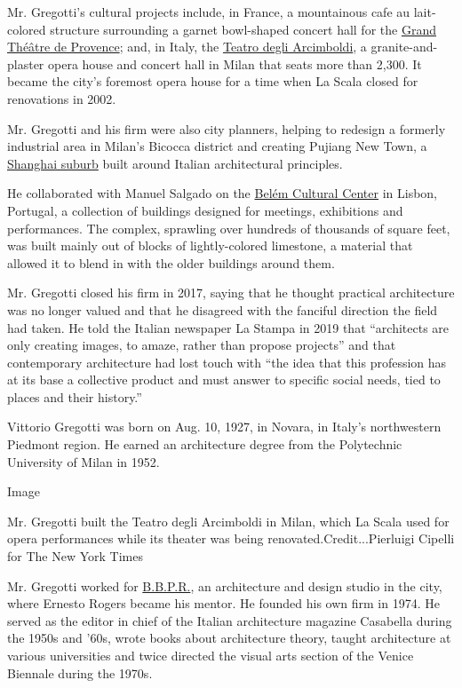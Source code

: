 Mr. Gregotti's cultural projects include, in France, a mountainous cafe
au lait-colored structure surrounding a garnet bowl-shaped concert hall
for the
\href{http://www.aixenprovence.fr/Grand-Theatre-de-Provence}{Grand
Théâtre de Provence}; and, in Italy, the
\href{http://teatroarcimboldi.it/index.php}{Teatro degli Arcimboldi}, a
granite-and-plaster opera house and concert hall in Milan that seats
more than 2,300. It became the city's foremost opera house for a time
when La Scala closed for renovations in 2002.

Mr. Gregotti and his firm were also city planners, helping to redesign a
formerly industrial area in Milan's Bicocca district and creating
Pujiang New Town, a
\href{http://travel.cnn.com/shanghai/visit/shanghais-italian-town-224942/}{Shanghai
suburb} built around Italian architectural principles.

He collaborated with Manuel Salgado on the
\href{https://www.ccb.pt/Default/pt/Inicio/Institucional/Historial}{Belém
Cultural Center} in Lisbon, Portugal, a collection of buildings designed
for meetings, exhibitions and performances. The complex, sprawling over
hundreds of thousands of square feet, was built mainly out of blocks of
lightly-colored limestone, a material that allowed it to blend in with
the older buildings around them.

Mr. Gregotti closed his firm in 2017, saying that he thought practical
architecture was no longer valued and that he disagreed with the
fanciful direction the field had taken. He told the Italian newspaper La
Stampa in 2019 that ``architects are only creating images, to amaze,
rather than propose projects'' and that contemporary architecture had
lost touch with ``the idea that this profession has at its base a
collective product and must answer to specific social needs, tied to
places and their history.''

Vittorio Gregotti was born on Aug. 10, 1927, in Novara, in Italy's
northwestern Piedmont region. He earned an architecture degree from the
Polytechnic University of Milan in 1952.

Image

Mr. Gregotti built the Teatro degli Arcimboldi in Milan, which La Scala
used for opera performances while its theater was being
renovated.Credit...Pierluigi Cipelli for The New York Times

Mr. Gregotti worked for
\href{https://www.casatigallery.com/designers/studio-bbpr/}{B.B.P.R.},
an architecture and design studio in the city, where Ernesto Rogers
became his mentor. He founded his own firm in 1974. He served as the
editor in chief of the Italian architecture magazine Casabella during
the 1950s and '60s, wrote books about architecture theory, taught
architecture at various universities and twice directed the visual arts
section of the Venice Biennale during the 1970s.

